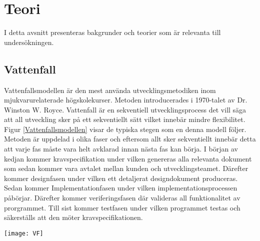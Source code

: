 \section{Teori} \label{sec:Lieth_Wahid-theory}
I detta avsnitt presenteras bakgrunder och teorier som är relevanta till undersökningen. 
\subsection{Vattenfall}
Vattenfallsmodellen är den mest använda utvecklingsmetodiken inom mjukvarurelaterade högskolekurser. Metoden introducerades i 1970-talet  \cite{WaterfalM} av Dr. Winston W. Royce\cite{managing}. Vattenfall är en sekventiell utvecklingsprocess det vill säga att all utveckling sker på ett sekventiellt sätt vilket innebär mindre flexibilitet. Figur \ref{Vattenfallsmodellen} visar de typiska 
stegen som en denna modell följer. Metoden är uppdelad i olika faser och eftersom allt sker sekventiellt innebär detta att varje fas måste vara helt avklarad innan nästa fas kan börja.  I början av kedjan kommer kravspecifikation under vilken genereras alla relevanta dokument som sedan kommer vara avtalet mellan kunden och utvecklingsteamet. \cite{GameDesign} Därefter kommer designfasen under vilken ett detaljerat designdokument produceras. Sedan kommer Implementationfasen under vilken implementationsprocessen  påbörjar. Därefter kommer veriferingsfasen där valideras all funktionalitet  av prorgrammet. Till sist kommer testfasen under vilken programmet testas och säkerställs  att den möter kravspecifikationen.
\begin{figure*}[h]
	\centering
	\texttt{[image: VF]}
	\caption{Vattenfallsmodellen\cite{theWaterFall}}
	\label{Vattenfallsmodellen}
\end{figure*}
